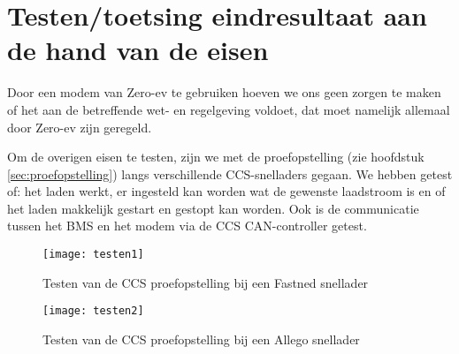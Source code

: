 \chapter{Testen/toetsing eindresultaat aan de hand van de eisen}
\label{Toetsing_eindresultaat_aan_de_hand_van_de_eisen}

Door een modem van Zero-ev te gebruiken hoeven we ons geen zorgen te maken of
het aan de betreffende wet- en regelgeving voldoet, dat moet namelijk allemaal
door Zero-ev zijn geregeld. 

Om de overigen eisen te testen, zijn we met de proefopstelling (zie hoofdstuk
\ref{sec:proefopstelling}) langs verschillende CCS-snelladers gegaan. We hebben
getest of: het laden werkt, er ingesteld kan worden wat de gewenste laadstroom
is en of het laden makkelijk gestart en gestopt kan worden. Ook is de
communicatie tussen het BMS en het modem via de CCS CAN-controller getest.



\begin{figure}[]
    \centering
    \begin{minipage}{0.45\textwidth}
        \centerline{\texttt{[image: testen1]}}
        \caption{Testen van de CCS proefopstelling bij een Fastned snellader}
        \label{fig:testen1}
    \end{minipage}\hfill
    \begin{minipage}{0.45\textwidth}
        \centerline{\texttt{[image: testen2]}}
        \caption{Testen van de CCS proefopstelling bij een Allego snellader}
        \label{fig:testen2}
    \end{minipage}
\end{figure}
